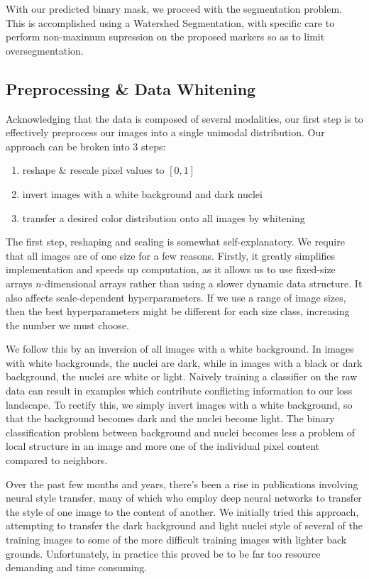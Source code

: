 \documentclass[paper=letter, fontsize=12pt]{article}
\numberwithin{equation}{section} %
\numberwithin{figure}{section} %
\numberwithin{table}{section} %
\begin{document}
With our predicted binary mask, we proceed with the segmentation problem.  This
is accomplished using a Watershed Segmentation, with specific care to perform
non-maximum supression on the proposed markers so as to limit oversegmentation.

\subsection{Preprocessing \& Data Whitening}

Acknowledging that the data is composed of several modalities, our first step
is to effectively preprocess our images into a single unimodal distribution.
Our approach can be broken into 3 steps:
\begin{enumerate}
    \item reshape \& rescale pixel values to $[0, 1]$
    \item invert images with a white background and dark nuclei
    \item transfer a desired color distribution onto all images by whitening
\end{enumerate}

The first step, reshaping and scaling is somewhat self-explanatory.  We require
that all images are of one size for a few reasons.  Firstly, it greatly
simplifies implementation and speeds up computation, as it allows us to use
fixed-size arrays $n$-dimensional arrays rather than using a slower dynamic
data structure.  It also affects scale-dependent hyperparameters.  If we use a
range of image sizes, then the best hyperparameters might be different for each
size class, increasing the number we must choose.

We follow this by an inversion of all images with a white background.  In
images with white backgrounds, the nuclei are dark, while in images with a
black or dark background, the nuclei are white or light.  Naively training a
classifier on the raw data can result in examples which contribute conflicting
information to our loss landscape.  To rectify this, we simply invert images
with a white background, so that the background becomes dark and the nuclei
become light.  The binary classification problem between background and nuclei
becomes less a problem of local structure in an image and more one of
the individual pixel content compared to neighbors.

Over the past few months and years, there's been a rise in publications
involving neural style transfer, many of which who employ deep neural networks
to transfer the style of one image to the content of another. We initially
tried this approach, attempting to transfer the dark background and light
nuclei style of several of the training images to some of the more difficult
training images with lighter back grounds. Unfortunately, in practice this
proved be to be far too resource demanding and time consuming.
\end{document}
